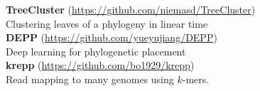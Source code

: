 \documentclass[margin,line,letterpaper]{resume}
\begin{document}
\begin{resume}
\textbf{TreeCluster} (\url{https://github.com/niemasd/TreeCluster})\\
Clustering leaves of a phylogeny in linear time 
\vspace{1.5mm}\\
\textbf{DEPP} (\url{https://github.com/yueyujiang/DEPP})\\
Deep learning for phylogenetic placement
\vspace{1.5mm}\\
\textbf{krepp} (\url{https://github.com/bo1929/krepp})\\
Read mapping to many genomes using $k$-mers.


\end{resume}
\end{document}

